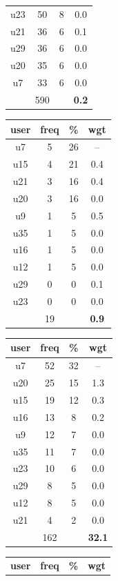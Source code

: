\begin{table}
\begin{tabular}{ |c|c|c|c| }
	u23 & 50 & 8 & 0.0 \\
	u21 & 36 & 6 & 0.1 \\
	u29 & 36 & 6 & 0.0 \\
	u20 & 35 & 6 & 0.0 \\
	u7 & 33 & 6 & 0.0 \\
	 & 590 & & \textbf{0.2} \\
	\hline
\end{tabular}
\begin{tabular}{ |c|c|c|c| }
	\hline
	\textbf{user} & \textbf{freq} & \textbf{\%} & \textbf{wgt} \\
	\hline
	u7 & 5 & 26 & -- \\
	u15 & 4 & 21 & 0.4 \\
	u21 & 3 & 16 & 0.4 \\
	u20 & 3 & 16 & 0.0 \\
	u9 & 1 & 5 & 0.5 \\
	u35 & 1 & 5 & 0.0 \\
	u16 & 1 & 5 & 0.0 \\
	u12 & 1 & 5 & 0.0 \\
	u29 & 0 & 0 & 0.1 \\
	u23 & 0 & 0 & 0.0 \\
	 & 19 & & \textbf{0.9} \\
	\hline
\end{tabular}
\begin{tabular}{ |c|c|c|c| }
	\hline
	\textbf{user} & \textbf{freq} & \textbf{\%} & \textbf{wgt} \\
	\hline
	u7 & 52 & 32 & -- \\
	u20 & 25 & 15 & 1.3 \\
	u15 & 19 & 12 & 0.3 \\
	u16 & 13 & 8 & 0.2 \\
	u9 & 12 & 7 & 0.0 \\
	u35 & 11 & 7 & 0.0 \\
	u23 & 10 & 6 & 0.0 \\
	u29 & 8 & 5 & 0.0 \\
	u12 & 8 & 5 & 0.0 \\
	u21 & 4 & 2 & 0.0 \\
	 & 162 & & \textbf{32.1} \\
	\hline
\end{tabular}
\begin{tabular}{ |c|c|c|c| }
	\hline
	\textbf{user} & \textbf{freq} & \textbf{\%} & \textbf{wgt} \\

\end{tabular}
\end{table}

